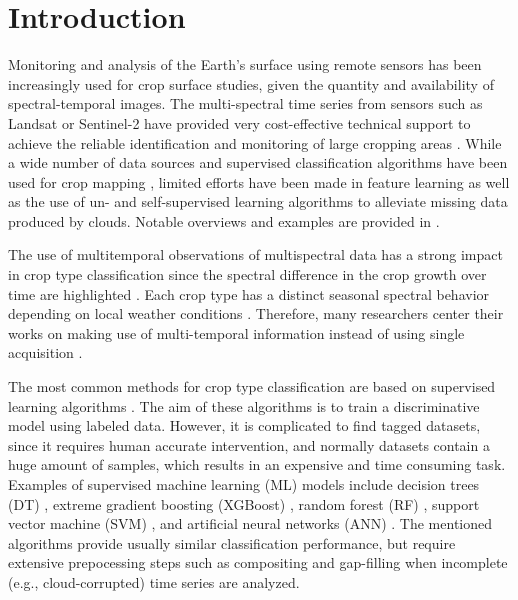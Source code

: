 \documentclass[journal,article,submit,pdftex,moreauthors]{Definitions/mdpi}
\begin{document}

\section{Introduction}
Monitoring and analysis of the Earth's surface using remote sensors has been increasingly used for crop surface studies, 
given the quantity and availability of spectral-temporal images. 
The multi-spectral time series from sensors such as Landsat or Sentinel-2 have provided very cost-effective technical support to achieve the reliable identification and monitoring of large cropping areas \cite{Vuolo2018, Pelletier2019, Foerster2012, Chen2022, Tariq2022, Gao2021}. 
While a wide number of data sources and supervised classification algorithms have been used for crop mapping \cite{Palchowdhuri2018,Heupel2018,Li2023,Dong2020,Paris2020,Russwurm2020,Nowakowski2021,Chen2022,Gadiraju2023, Wu2022}, limited efforts have been made in feature learning as well as the use of un- and self-supervised learning algorithms to alleviate missing data produced by clouds. Notable overviews and examples are provided in \cite{Yin2020,Yi2020,He2022, Dumeur2024, Wang2019}.

The use of multitemporal observations of multispectral data has a strong impact in crop type classification since the spectral difference in the crop growth over time are highlighted \cite{Vuolo2018,Yi2020, Gao2021, Maponya2020}.
Each crop type has a distinct seasonal spectral behavior depending on local weather conditions \cite{Foerster2012,Gao2021,Russwurm2020}. 
Therefore, many researchers center their works on making use of multi-temporal information instead of
using single acquisition \cite{Hu2016,Vuolo2018, Dong2020, Roy2020}.

The most common methods for crop type classification are based on supervised learning algorithms \cite{Kussul2017,Inglada2017,Cai2018,Feng2019,Kumar2020,Maponya2020,Russwurm2020,Chen2022,ManishLad2022, Agilandeeswari2022,Wu2022,Gadiraju2023}. 
The aim of these algorithms is to train a discriminative model using labeled data. However, it is complicated to find tagged datasets, since it requires human accurate intervention, and normally datasets contain a huge amount of samples, which results 
in an expensive and time consuming task. Examples of supervised machine learning (ML) models include decision trees (DT) \cite{Rokach2005}, extreme gradient boosting (XGBoost) \cite{Chen2016}, random forest (RF) \cite{Breiman2001}, support vector machine (SVM) \cite{cortes1995}, and artificial neural networks (ANN) \cite{Rosenblatt1958}.
The mentioned algorithms provide usually similar classification performance, but require extensive prepocessing steps such as compositing and gap-filling when incomplete (e.g., cloud-corrupted) time series are analyzed.
\end{document}
